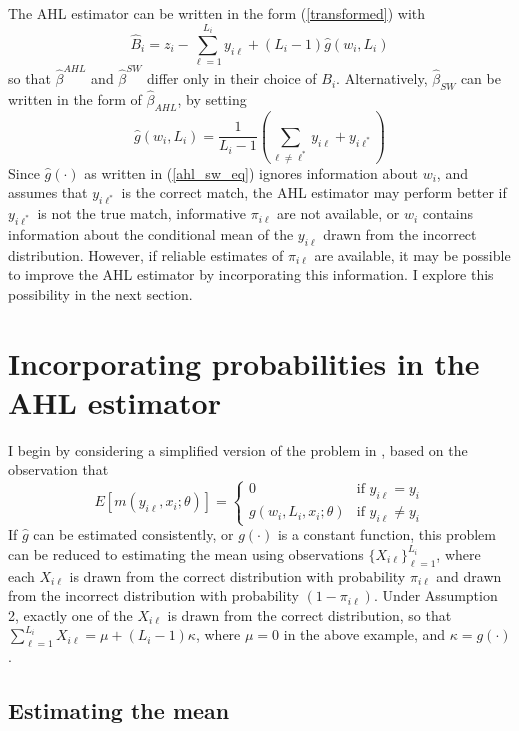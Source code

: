 \documentclass[12pt]{article}
\begin{document}
The AHL estimator can be written in the form (\ref{transformed}) with 
\begin{equation}
\hat{B}_i = z_i - \sum_{\ell=1}^{L_i} y_{i\ell} + (L_i -1) \hat{g}(w_i, L_i) \end{equation} 
so that $\hat{\beta}^{AHL}$ and $\hat{\beta}^{SW}$ differ only in their choice of $B_i$.  Alternatively, $\hat{\beta}_{SW}$ can be written in the form of $\hat{\beta}_{AHL}$, by setting 
\begin{equation} \hat{g}(w_i, L_i) = \frac{1}{L_i -1 }\left( \sum_{\ell \neq \ell^*} y_{i\ell} + y_{i\ell^*} \right) \label{ahl_sw_eq} \end{equation}
Since $\hat{g}(\cdot)$ as written in (\ref{ahl_sw_eq}) ignores information about $w_i$, and assumes that $y_{i\ell^*}$ is the correct match, the AHL estimator may perform better if $y_{i\ell^*}$ is not the true match, informative $\pi_{i\ell}$ are not available, or $w_i$ contains information about the conditional mean of the $y_{i\ell}$ drawn from the incorrect distribution.   However, if reliable estimates of $\pi_{i\ell}$ are available, it may be possible to improve the AHL estimator by incorporating this information.  I explore this possibility in the next section. 

\section{Incorporating probabilities in the AHL estimator} 

I begin by considering a simplified version of the problem in \citet*{ahl2019}, based on the observation that 
$$ E[m(y_{i\ell}, x_i; \theta)] =  \begin{cases} 0 & \text{if } y_{i\ell} = y_i \\
g(w_i, L_i, x_i; \theta) & \text{if } y_{i\ell} \neq y_i
\end{cases} $$
If $\hat{g}$ can be estimated consistently, or $g(\cdot)$ is a constant function, this problem can be reduced to estimating the mean using observations $\{X_{i\ell}\}_{\ell=1}^{L_i}$, where each $X_{i\ell}$ is drawn from the correct distribution with probability $\pi_{i\ell}$ and drawn from the incorrect distribution with probability $(1-\pi_{i\ell})$.  Under Assumption 2, exactly one of the $X_{i\ell}$ is drawn from the correct distribution, so that $\sum_{\ell=1}^{L_i} X_{i\ell} = \mu + (L_i -1) \kappa$, where $\mu =0$ in the above example, and $\kappa = g(\cdot)$. 

\subsection{Estimating the mean}
\end{document}
